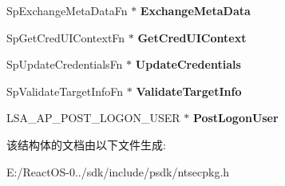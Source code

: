 \begin{DoxyCompactItemize}
\item 
\mbox{\label{struct_s_e_c_p_k_g___f_u_n_c_t_i_o_n___t_a_b_l_e_ac0e1f9e4753458942799743c678abc82}} 
Sp\+Exchange\+Meta\+Data\+Fn $\ast$ {\bfseries Exchange\+Meta\+Data}
\item 
\mbox{\label{struct_s_e_c_p_k_g___f_u_n_c_t_i_o_n___t_a_b_l_e_a7e17214a8f0ddde534fd2155c5492e6a}} 
Sp\+Get\+Cred\+U\+I\+Context\+Fn $\ast$ {\bfseries Get\+Cred\+U\+I\+Context}
\item 
\mbox{\label{struct_s_e_c_p_k_g___f_u_n_c_t_i_o_n___t_a_b_l_e_a031388181dcefb9a40b2caf34a6e74ad}} 
Sp\+Update\+Credentials\+Fn $\ast$ {\bfseries Update\+Credentials}
\item 
\mbox{\label{struct_s_e_c_p_k_g___f_u_n_c_t_i_o_n___t_a_b_l_e_a12251bdea14622e4ad6bca7fea483187}} 
Sp\+Validate\+Target\+Info\+Fn $\ast$ {\bfseries Validate\+Target\+Info}
\item 
\mbox{\label{struct_s_e_c_p_k_g___f_u_n_c_t_i_o_n___t_a_b_l_e_a998ce974daf17feae372ea2459a8dfeb}} 
L\+S\+A\+\_\+\+A\+P\+\_\+\+P\+O\+S\+T\+\_\+\+L\+O\+G\+O\+N\+\_\+\+U\+S\+ER $\ast$ {\bfseries Post\+Logon\+User}
\end{DoxyCompactItemize}


该结构体的文档由以下文件生成\+:\begin{DoxyCompactItemize}
\item 
E\+:/\+React\+O\+S-\/0../sdk/include/psdk/ntsecpkg.\+h\end{DoxyCompactItemize}
